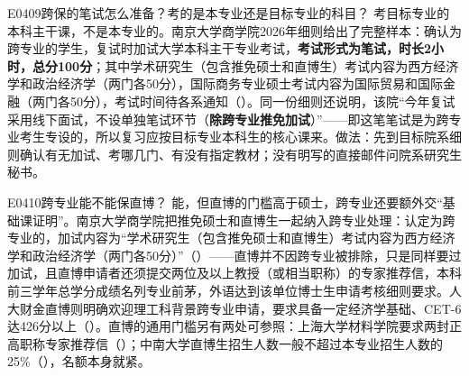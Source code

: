 \begin{qa}{E0409}{跨保的笔试怎么准备？考的是本专业还是目标专业的科目？}
考目标专业的本科主干课，不是本专业的。南京大学商学院2026年细则给出了完整样本：确认为跨专业的学生，复试时加试大学本科主干专业考试，\textbf{考试形式为笔试，时长2小时，总分100分}；其中学术研究生（包含推免硕士和直博生）考试内容为西方经济学和政治经济学（两门各50分），国际商务专业硕士考试内容为国际贸易和国际金融（两门各50分），考试时间待各系通知（）。同一份细则还说明，该院“今年复试采用线下面试，不设单独笔试环节（\textbf{除跨专业推免加试}）”——即这笔笔试是为跨专业考生专设的，所以复习应按目标专业本科生的核心课来。做法：先到目标院系细则确认有无加试、考哪几门、有没有指定教材；没有明写的直接邮件问院系研究生秘书。
\end{qa}

\begin{qa}{E0410}{跨专业能不能保直博？}
能，但直博的门槛高于硕士，跨专业还要额外交“基础课证明”。南京大学商学院把推免硕士和直博生一起纳入跨专业处理：认定为跨专业的，加试内容为“学术研究生（包含推免硕士和直博生）考试内容为西方经济学和政治经济学（两门各50分）”（）——直博并不因跨专业被排除，只是同样要过加试，且直博申请者还须提交两位及以上教授（或相当职称）的专家推荐信，本科前三学年总学分成绩名列专业前茅，外语达到该单位博士生申请考核细则要求。人大财金直博则明确欢迎理工科背景跨专业申请，要求具备一定经济学基础、CET-6达426分以上（）。直博的通用门槛另有两处可参照：上海大学材料学院要求两封正高职称专家推荐信（）；中南大学直博生招生人数一般不超过本专业招生人数的25\%（），名额本身就紧。
\end{qa}

